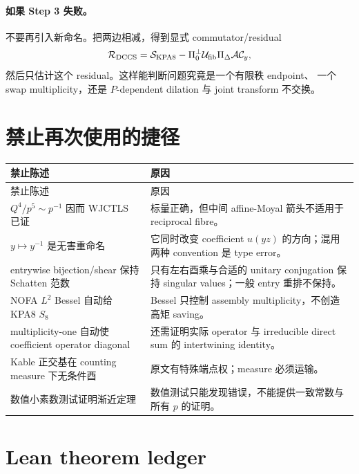 \documentclass[11pt,a4paper]{ctexart}
\theoremstyle{definition}
\newcommand{\1}{\mathbf 1}
\begin{document}
\paragraph{如果 Step 3 失败。}
不要再引入新命名。把两边相减，得到显式 commutator/residual
\[
\mathcal R_{\rm DCCS}
=\mathcal S_{\rm KPA8}
-\Pi_0^\perp\mathcal U_{\rm fib}\Pi_\Delta\mathcal A\mathcal C_y,
\]
然后只估计这个 residual。这样能判断问题究竟是一个有限秩 endpoint、
一个 swap multiplicity，还是 $P$-dependent dilation 与 joint transform 不交换。

\section{禁止再次使用的捷径}

\begin{longtable}{p{}p{}}
\toprule
禁止陈述 & 原因\\
\midrule
\endfirsthead
\toprule
禁止陈述 & 原因\\
\midrule
\endhead
$Q^4/p^5\sim p^{-1}$ 因而 WJCTLS 已证
& 标量正确，但中间 affine-Moyal 箭头不适用于 reciprocal fibre。\\
$y\mapsto y^{-1}$ 是无害重命名
& 它同时改变 coefficient $u(yz)$ 的方向；混用两种 convention 是 type error。\\
entrywise bijection/shear 保持 Schatten 范数
& 只有左右酉乘与合适的 unitary conjugation 保持 singular values；一般 entry
重排不保持。\\
NOFA $L^2$ Bessel 自动给 KPA8 $S_8$
& Bessel 只控制 assembly multiplicity，不创造高矩 saving。\\
multiplicity-one 自动使 coefficient operator diagonal
& 还需证明实际 operator 与 irreducible direct sum 的 intertwining identity。\\
Kable 正交基在 counting measure 下无条件酉
& 原文有特殊端点权；measure 必须运输。\\
数值小素数测试证明渐近定理
& 数值测试只能发现错误，不能提供一致常数与所有 $p$ 的证明。\\
\bottomrule
\end{longtable}

\section{Lean theorem ledger}
\end{document}
